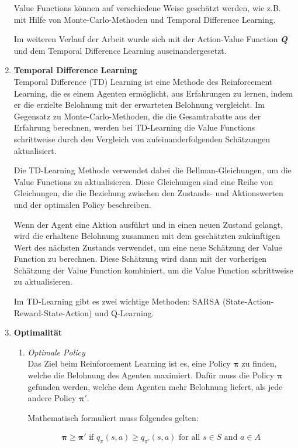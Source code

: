 \begin{enumerate}
    Value Functions können auf verschiedene Weise geschätzt werden, wie z.B. mit Hilfe von Monte-Carlo-Methoden und Temporal Difference Learning.

    Im weiteren Verlauf der Arbeit wurde sich mit der Action-Value Function \textbf{\textit{Q}} und dem Temporal Difference Learning auseinandergesetzt.
    
    \item \textbf{Temporal Difference Learning}\\
    Temporal Difference (TD) Learning \cite{mediumTemporalDifference} ist eine Methode des Reinforcement Learning, die es einem Agenten ermöglicht, aus Erfahrungen zu lernen, indem er die erzielte Belohnung mit der erwarteten Belohnung vergleicht. Im Gegensatz zu Monte-Carlo-Methoden, die die Gesamtrabatte aus der Erfahrung berechnen, werden bei TD-Learning die Value Functions schrittweise durch den Vergleich von aufeinanderfolgenden Schätzungen aktualisiert.

    Die TD-Learning Methode verwendet dabei die Bellman-Gleichungen, um die Value Functions zu aktualisieren. Diese Gleichungen sind eine Reihe von Gleichungen, die die Beziehung zwischen den Zustands- und Aktionswerten und der optimalen Policy beschreiben.

    Wenn der Agent eine Aktion ausführt und in einen neuen Zustand gelangt, wird die erhaltene Belohnung zusammen mit dem geschätzten zukünftigen Wert des nächsten Zustands verwendet, um eine neue Schätzung der Value Function zu berechnen. Diese Schätzung wird dann mit der vorherigen Schätzung der Value Function kombiniert, um die Value Function schrittweise zu aktualisieren.

    Im TD-Learning gibt es zwei wichtige Methoden: SARSA (State-Action-Reward-State-Action) und Q-Learning.

    \item \textbf{Optimalität}\\
    \begin{enumerate}
        \item \textit{Optimale Policy}\\
        Das Ziel beim Reinforcement Learning ist es, eine Policy {$\bm{\pi}$} zu finden, welche die Belohnung des Agenten maximiert. Dafür muss die Policy {$\bm{\pi}$} gefunden werden, welche dem Agenten mehr Belohnung liefert, als jede andere Policy {$\bm{\pi'}$}.
        
        Mathematisch formuliert muss folgendes gelten:

        \begin{align}
            \bm{\pi} \geq \bm{\pi'}\text{ if } q_{\pi}(s,a) \geq  q_{\pi'}(s,a)\text{ for all } s \in S \text{ and } a \in A
        \end{align}


\end{enumerate}
\end{enumerate}
